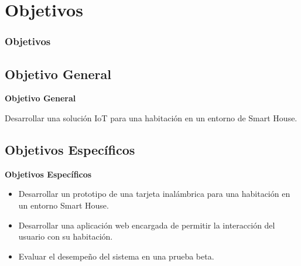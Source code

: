 \section{Objetivos}
\frametitle{Objetivos}

\subsection{Objetivo General}
\textbf{Objetivo General}

Desarrollar una solución IoT para una habitación en un entorno de Smart House.\newline


\subsection{Objetivos Específicos}
\textbf{Objetivos Específicos}

\begin{itemize}
	\item Desarrollar un prototipo de una tarjeta inalámbrica para una habitación en un entorno Smart House.
	\item Desarrollar una aplicación web encargada de permitir la interacción del usuario con su habitación.
	\item Evaluar el desempeño del sistema en una prueba beta.
\end{itemize}
